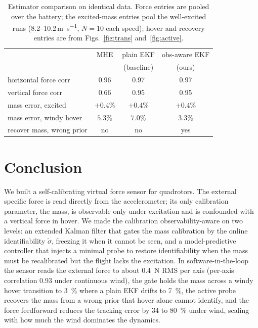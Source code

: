 \documentclass[lettersize,journal]{IEEEtran}
\begin{document}
\begin{table}[t]
\centering
\caption{Estimator comparison on identical data. Force entries are pooled over
the battery; the excited-mass entries pool the well-excited runs
(8.2--10.2\,\si{\meter\per\second}, $N{=}10$ each speed); hover and recovery
entries are from Figs.~\ref{fig:trans} and~\ref{fig:active}.}
\label{tab:compare}
\begin{tabular}{lccc}
\toprule
 & MHE & plain EKF & obs-aware EKF \\
 &     & (baseline) & (ours) \\
\midrule
horizontal force corr      & 0.96 & 0.97 & 0.97 \\
vertical force corr        & 0.66 & 0.95 & 0.95 \\
mass error, excited        & $+0.4\%$ & $+0.4\%$ & $+0.4\%$ \\
mass error, windy hover    & $5.3\%$ & $7.0\%$ & $\mathbf{3.3\%}$ \\
recover mass, wrong prior  & no & no & yes \\
\bottomrule
\end{tabular}
\end{table}

\section{Conclusion}\label{sec:conclusion}

We built a self-calibrating virtual force sensor for quadrotors. The external
specific force is read directly from the accelerometer; its only calibration
parameter, the mass, is observable only under excitation and is confounded with a
vertical force in hover. We made the calibration observability-aware on two levels:
an extended Kalman filter that gates the mass calibration by the online
identifiability $\tilde\sigma$, freezing it when it cannot be seen, and a
model-predictive controller that injects a minimal probe to restore identifiability
when the mass must be recalibrated but the flight lacks the excitation. In
software-in-the-loop the sensor reads the external force to about \SI{0.4}{\newton}
RMS per axis (per-axis correlation \num{0.93} under continuous wind), the gate holds
the mass across a windy hover transition to \SI{3}{\percent} where a plain EKF drifts to
\SI{7}{\percent}, the active probe
recovers the mass from a wrong prior that hover alone cannot identify, and the
force feedforward reduces the tracking error by \SI{34}{} to \SI{80}{\percent}
under wind, scaling with how much the wind dominates the dynamics.
\end{document}
